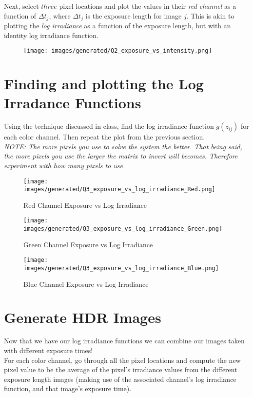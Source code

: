\documentclass{article}
\begin{document}
\noindent
Next, select $three$ pixel locations and plot the values in their \emph{red channel} as a function of $\Delta t_j$, where $\Delta t_j$ is the exposure length for image $j$.  This is akin to plotting the \emph{log irradiance} as a function of the exposure length, but with an identity log irradiance function.\\

\begin{figure}[h]
    \texttt{[image: images/generated/Q2\_exposure\_vs\_intensity.png]}
\end{figure}

\newpage
\section{Finding and plotting the Log Irradance Functions}
Using the technique discussed in class, find the log irradiance function $g(z_{ij})$ for each color channel.  Then repeat the plot from the previous section.\\

\noindent
\emph{NOTE:  The more pixels you use to solve the system the better.  That being said, the more pixels you use the larger the matrix to invert will becomes.   Therefore experiment with how many pixels to use.}

\begin{figure}[h]
    \texttt{[image: images/generated/Q3\_exposure\_vs\_log\_irradiance\_Red.png]}
    \caption {Red Channel Exposure vs Log Irradiance}
\end{figure}
\begin{figure}[h]
    \texttt{[image: images/generated/Q3\_exposure\_vs\_log\_irradiance\_Green.png]}
    \caption {Green Channel Exposure vs Log Irradiance}
\end{figure}

\begin{figure}[h]
    \texttt{[image: images/generated/Q3\_exposure\_vs\_log\_irradiance\_Blue.png]}
    \caption {Blue Channel Exposure vs Log Irradiance}
\end{figure}

\newpage

\section{Generate HDR Images}
Now that we have our log irradiance functions we can combine our images taken with different exposure times!\\

\noindent
For each color channel, go through all the pixel locations and compute the new pixel value to be the average of the pixel's irradiance values from the different exposure length images (making use of the associated channel's log irradiance function, and that image's exposure time).\\  
\end{document}
